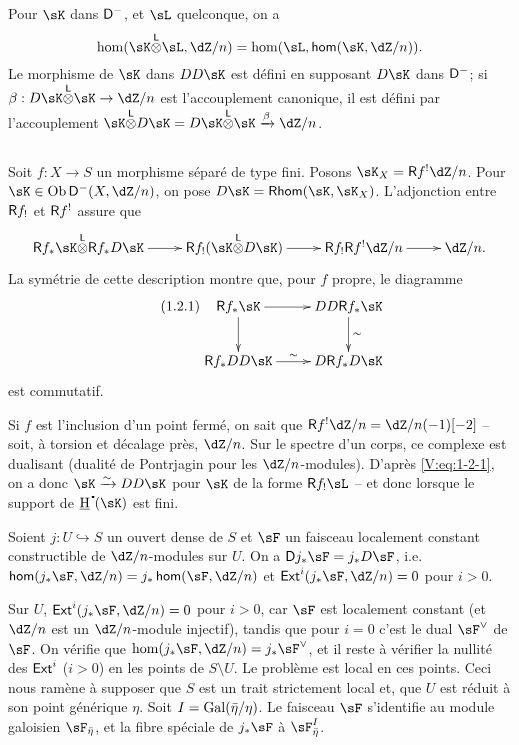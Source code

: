 Pour $\sK$ dans $\mathsf{D}^-$, et $\sL$ quelconque, on a 
\[
  \hom(\sK\lotimes \sL,\dZ/n) = \hom(\sL,\Hom(\sK,\dZ/n)) \text{.}
\]
Le morphisme de $\sK$ dans $DD\sK$ est défini en supposant $D\sK$ dans 
$\mathsf{D}^-$; si $\beta:D\sK\lotimes\sK\to \dZ/n$ est l'accouplement canonique, il 
est défini par l'accouplement 
$\sK\lotimes D\sK=D\sK\lotimes \sK \xrightarrow\beta \dZ/n$. 





\subsection{}\label{V:1-2}

Soit $f:X\to S$ un morphisme séparé de type fini. Posons 
$\sK_X=\R f^!\dZ/n$. Pour $\sK\in \ob\D^-(X,\dZ/n)$, on pose 
$D\sK = \rHom(\sK,\sK_X)$. L'adjonction entre $\mathsf{R} f_!$ et $\mathsf{R} f^!$ 
assure que 
\[\xymatrix{
  \R f_\ast \sK\lotimes \R f_\ast D\sK \ar[r] 
    & \R f_! (\sK\lotimes D\sK) \ar[r] 
    & \R f_! \R f^! \dZ/n \ar[r] 
    & \dZ/n \text{.}
}\]
La symétrie de cette description montre que, pour $f$ propre, le diagramme 
\begin{equation*}\tag{1.2.1}\label{V:eq:1-2-1}
\xymatrix{
  \R f_\ast \sK \ar[r] \ar[d] 
    & D D \R f_\ast \sK \ar[d]^-\sim \\
  \R f_\ast D D \sK \ar[r]^\sim 
    & D\R f_\ast D\sK
}
\end{equation*}
est commutatif. 

Si $f$ est l'inclusion d'un point fermé, on sait que 
$\R f^!\dZ/n=\dZ/n(-1)[-2]$ -- soit, à torsion et décalage près, $\dZ/n$. 
Sur le spectre d'un corps, ce complexe est dualisant (dualité de Pontrjagin 
pour les $\dZ/n$-modules). D'après \eqref{V:eq:1-2-1}, on a donc 
$\sK\iso D D\sK$ pour $\sK$ de la forme $\R f_!\sL$ -- et donc lorsque le 
support de $\underline\h^\bullet(\sK)$ est fini. 





\begin{theorem_}\label{V:1-3}
Soient $j:U\hookrightarrow S$ un ouvert dense de $S$ et $\sF$ un faisceau 
localement constant constructible de $\dZ/n$-modules sur $U$. On a 
$\D j_\ast \sF = j_\ast D \sF$, i.e. $\Hom(j_\ast \sF,\dZ/n) = j_\ast\Hom(\sF,\dZ/n)$ et $\Ext^i(j_\ast\sF,\dZ/n) = 0$ pour $i>0$.
\end{theorem_}

Sur $U$, $\Ext^i(j_\ast\sF,\dZ/n)=0$ pour $i>0$, car $\sF$ est localement 
constant (et $\dZ/n$ est un $\dZ/n$-module injectif), tandis que pour $i=0$ 
c'est le dual $\sF^\vee$ de $\sF$. On vérifie que 
$\hom(j_\ast\sF,\dZ/n)=j_\ast\sF^\vee$, et il reste à vérifier la nullité 
des $\operatorname{\mathsf{Ext}}^i$ ($i>0$) en les points de $S\setminus U$. Le problème est local 
en ces points. Ceci nous ramène à supposer que $S$ est un trait strictement 
local et, que $U$ est réduit à son point générique $\eta$. Soit 
$I=\operatorname{Gal}(\bar\eta/\eta)$. Le faisceau $\sF$ s'identifie au module galoisien 
$\sF_{\bar\eta}$, et la fibre spéciale de $j_\ast \sF$ à 
$\sF_{\bar\eta}^I$. 

